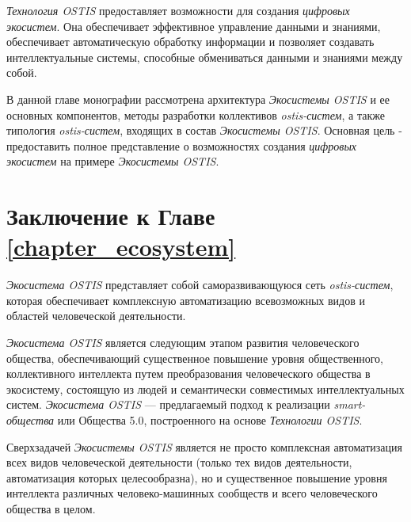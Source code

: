 \textit{Технология OSTIS} предоставляет возможности для создания \textit{цифровых экосистем}. Она обеспечивает эффективное управление данными и знаниями, обеспечивает автоматическую обработку информации и позволяет создавать интеллектуальные системы, способные обмениваться данными и знаниями между собой.

В данной главе монографии рассмотрена архитектура \textit{Экосистемы OSTIS} и ее основных компонентов, методы разработки коллективов \textit{ostis-систем}, а также типология \textit{ostis-систем}, входящих в состав \textit{Экосистемы OSTIS}. Основная цель - предоставить полное представление о возможностях создания \textit{цифровых экосистем} на примере \textit{Экосистемы OSTIS}.


%
%
%

%

\section*{Заключение к Главе \ref{chapter_ecosystem}}

\textit{Экосистема OSTIS} представляет собой саморазвивающуюся сеть \textit{ostis-систем}, которая обеспечивает комплексную автоматизацию всевозможных видов и областей человеческой деятельности. 

\textit{Экосистема OSTIS} является следующим этапом развития человеческого общества, обеспечивающий существенное повышение уровня общественного, коллективного интеллекта путем преобразования человеческого общества в экосистему, состоящую из людей и семантически совместимых интеллектуальных систем. 
\textit{Экосистема OSTIS} --- предлагаемый подход к реализации \textit{smart-общества} или Общества 5.0, построенного на основе \textit{Технологии OSTIS}.

Сверхзадачей \textit{Экосистемы OSTIS} является не просто комплексная автоматизация всех видов человеческой деятельности (только тех видов деятельности, автоматизация которых целесообразна), но и существенное повышение уровня интеллекта различных человеко-машинных сообществ и всего человеческого общества в целом.
